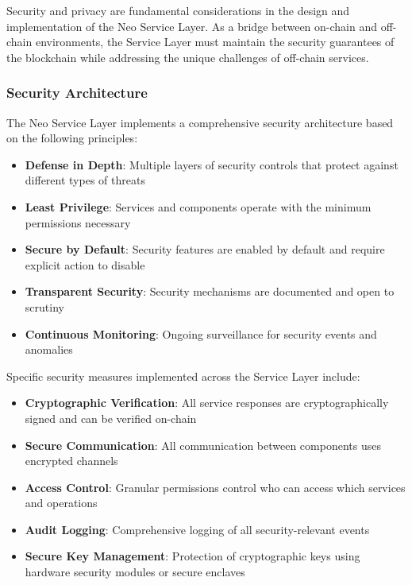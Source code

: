 \documentclass{article}
\begin{document}
Security and privacy are fundamental considerations in the design and implementation of the Neo Service Layer. As a bridge between on-chain and off-chain environments, the Service Layer must maintain the security guarantees of the blockchain while addressing the unique challenges of off-chain services.

\subsubsection{Security Architecture}
\label{subsubsec:security-architecture}

The Neo Service Layer implements a comprehensive security architecture based on the following principles:

\begin{itemize}
    \item \textbf{Defense in Depth}: Multiple layers of security controls that protect against different types of threats
    \item \textbf{Least Privilege}: Services and components operate with the minimum permissions necessary
    \item \textbf{Secure by Default}: Security features are enabled by default and require explicit action to disable
    \item \textbf{Transparent Security}: Security mechanisms are documented and open to scrutiny
    \item \textbf{Continuous Monitoring}: Ongoing surveillance for security events and anomalies
\end{itemize}

Specific security measures implemented across the Service Layer include:

\begin{itemize}
    \item \textbf{Cryptographic Verification}: All service responses are cryptographically signed and can be verified on-chain
    \item \textbf{Secure Communication}: All communication between components uses encrypted channels
    \item \textbf{Access Control}: Granular permissions control who can access which services and operations
    \item \textbf{Audit Logging}: Comprehensive logging of all security-relevant events
    \item \textbf{Secure Key Management}: Protection of cryptographic keys using hardware security modules or secure enclaves
\end{itemize}
\end{document}

